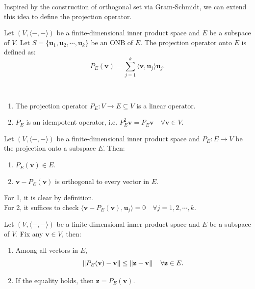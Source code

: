 \documentclass[12pt]{article}
\begin{document}
Inspired by the construction of orthogonal set via Gram-Schmidt, we can extend this idea to define the projection operator.

\begin{definition}
    Let $(V,\langle-,-\rangle)$ be a finite-dimensional inner product space and $E$ be a subspace of $V$.
    Let $S=\{\mathbf{u}_1,\mathbf{u}_2,\cdots,\mathbf{u}_k\}$ be an ONB of $E$. The projection operator onto $E$ is defined as:
    \[P_E(\mathbf{v})=\sum_{j=1}^{k}\langle \mathbf{v}, \mathbf{u}_j\rangle \mathbf{u}_j.\] 
\end{definition}

\begin{remark}\
    \begin{enumerate}
        \item The projection operator $P_E:V\to E\subseteq V$ is a linear operator.
        \item $P_E$ is an idempotent operator, i.e. $P^2_E \mathbf{v} = P_E \mathbf{v}\quad\forall \mathbf{v}\in V$.
    \end{enumerate}
\end{remark}

\begin{theorem}
    Let $(V,\langle-,-\rangle)$ be a finite-dimensional inner product space and $P_E:E\to V$ be the projection onto a subspace $E$.
    Then:
    \begin{enumerate}
        \item $P_E(\mathbf{v})\in E$.
        \item $\mathbf{v}-P_E(\mathbf{v})$ is orthogonal to every vector in $E$.
    \end{enumerate}
\end{theorem}

\begin{pfbox}
    For 1, it is clear by definition.\\
    For 2, it suffices to check $\langle \mathbf{v}-P_E(\mathbf{v}), \mathbf{u}_j\rangle=0\quad \forall j=1,2,\cdots,k.$
\end{pfbox}

\begin{theorem}
 Let $(V,\langle-,-\rangle)$ be a finite-dimensional inner product space and $E$ be a subspace of $V$.
 Fix any $\mathbf{v}\in V$, then:
 \begin{enumerate}
    \item Among all vectors in $E$,
    $$\left\lVert P_E(\mathbf{v})-\mathbf{v} \right\rVert\le\left\lVert \mathbf{z}-\mathbf{v} \right\rVert\quad \forall \mathbf{z}\in E.$$
    \item If the equality holds, then $\mathbf{z}=P_E(\mathbf{v}).$
 \end{enumerate}
\end{theorem}
\end{document}
